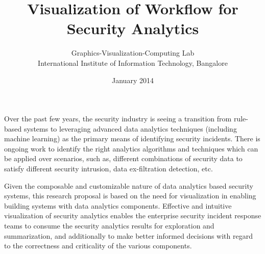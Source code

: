 \documentclass{article}
\title{Visualization of Workflow for Security Analytics}
\author{Graphics-Visualization-Computing Lab \\
International Institute of Information Technology, Bangalore}
\date{January 2014}
\begin{document}
\maketitle

Over the past few years, the security industry is seeing a transition from rule-based systems to leveraging advanced data analytics techniques (including machine learning) as the primary means of identifying security incidents. There is ongoing work to identify the right analytics algorithms and techniques which can be applied over scenarios, such as, different combinations of security data to satisfy different security intrusion, data ex-filtration detection, etc. 

Given the composable and customizable nature of data analytics based security
systems, this research proposal is based on the need for visualization in
enabling building systems with data analytics components. Effective and
intuitive visualization of security analytics enables the enterprise security
incident response teams to consume the security analytics results for
exploration and summarization, and additionally to make better informed
decisions with regard to the correctness and criticality of the various
components. 

\end{document}
